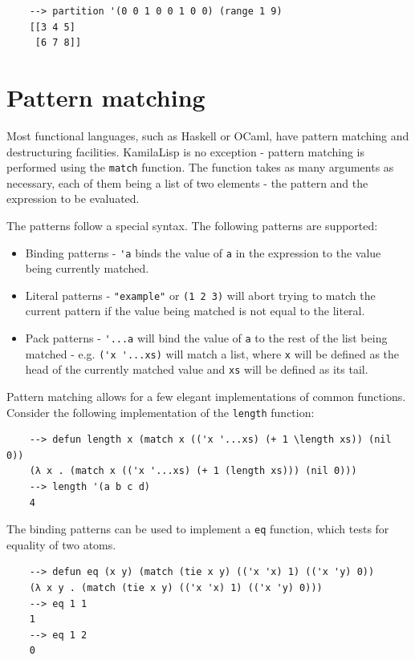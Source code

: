 \begin{Verbatim}
    --> partition '(0 0 1 0 0 1 0 0) (range 1 9)
    [[3 4 5]
     [6 7 8]]
\end{Verbatim}

\section{Pattern matching}

Most functional languages, such as Haskell or OCaml, have pattern matching and destructuring facilities. KamilaLisp is no exception - pattern matching is performed using the \verb|match| function. The function takes as many arguments as necessary, each of them being a list of two elements - the pattern and the expression to be evaluated.

The patterns follow a special syntax. The following patterns are supported:

\begin{itemize}
    \item Binding patterns - \verb|'a| binds the value of \verb|a| in the expression to the value being currently matched.
    \item Literal patterns - \verb|"example"| or \verb|(1 2 3)| will abort trying to match the current pattern if the value being matched is not equal to the literal.
    \item Pack patterns - \verb|'...a| will bind the value of \verb|a| to the rest of the list being matched - e.g. \verb|('x '...xs)| will match a list, where \verb|x| will be defined as the head of the currently matched value and \verb|xs| will be defined as its tail.
\end{itemize}

Pattern matching allows for a few elegant implementations of common functions. Consider the following implementation of the \verb|length| function:

\begin{Verbatim}
    --> defun length x (match x (('x '...xs) (+ 1 \length xs)) (nil 0))
    (λ x . (match x (('x '...xs) (+ 1 (length xs))) (nil 0)))
    --> length '(a b c d)
    4
\end{Verbatim}

The binding patterns can be used to implement a \verb|eq| function, which tests for equality of two atoms.

\begin{Verbatim}
    --> defun eq (x y) (match (tie x y) (('x 'x) 1) (('x 'y) 0))
    (λ x y . (match (tie x y) (('x 'x) 1) (('x 'y) 0)))
    --> eq 1 1
    1
    --> eq 1 2
    0
\end{Verbatim}

